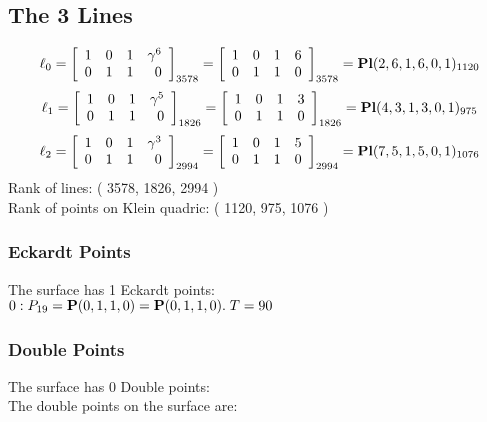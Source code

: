 \documentclass{article}
\newcommand{\bP}{{\bf P}}
\begin{document}
{\subsection*{The 3 Lines}
$$
\ell_{0} = 
\left[
\begin{array}{*{4}{r}}
1 & 0 & 1 & \gamma^{6}\\
0 & 1 & 1 & 0\\
\end{array}
\right]
_{3578}
=
\left[
\begin{array}{*{4}c}
1  & 0  & 1  & 6\\
0  & 1  & 1  & 0\\
\end{array}
\right]_{3578}
={\rm\bf Pl}(2,6,1,6,0,1 )_{1120}$$
$$
\ell_{1} = 
\left[
\begin{array}{*{4}{r}}
1 & 0 & 1 & \gamma^{5}\\
0 & 1 & 1 & 0\\
\end{array}
\right]
_{1826}
=
\left[
\begin{array}{*{4}c}
1  & 0  & 1  & 3\\
0  & 1  & 1  & 0\\
\end{array}
\right]_{1826}
={\rm\bf Pl}(4,3,1,3,0,1 )_{975}$$
$$
\ell_{2} = 
\left[
\begin{array}{*{4}{r}}
1 & 0 & 1 & \gamma^{3}\\
0 & 1 & 1 & 0\\
\end{array}
\right]
_{2994}
=
\left[
\begin{array}{*{4}c}
1  & 0  & 1  & 5\\
0  & 1  & 1  & 0\\
\end{array}
\right]_{2994}
={\rm\bf Pl}(7,5,1,5,0,1 )_{1076}$$
Rank of lines: ( 3578, 1826, 2994 )\\
Rank of points on Klein quadric: ( 1120, 975, 1076 )\\
\subsubsection*{Eckardt Points}
The surface has 1 Eckardt points:\\
$0 : P_{19}=\bP(0, 1, 1, 0) = \bP(0, 1, 1, 0).\; T= 90$\\
\subsubsection*{Double Points}
The surface has 0 Double points:\\
The double points on the surface are:\\
\begin{multicols}{2}
\noindent
\end{multicols}
}
\end{document}

